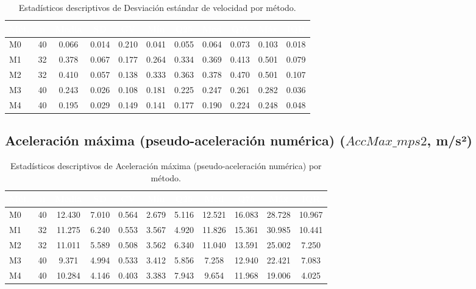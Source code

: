 \documentclass[12pt,a4paper,oneside]{book}
\begin{document}
\begin{table}[H]
\centering
\caption{Estadísticos descriptivos de Desviación estándar de velocidad por método.}
\renewcommand{\arraystretch}{1.25}
\small
\begin{tabular}{lcccccccccc}
\toprule
\rowcolor{primary}
\textcolor{white}{\textbf{Mét.}} & \textcolor{white}{\textbf{n}} & \textcolor{white}{\textbf{Media}} & \textcolor{white}{\textbf{SD}} & \textcolor{white}{\textbf{CV}} & \textcolor{white}{\textbf{Mín}} & \textcolor{white}{\textbf{Q25}} & \textcolor{white}{\textbf{Med}} & \textcolor{white}{\textbf{Q75}} & \textcolor{white}{\textbf{Máx}} & \textcolor{white}{\textbf{IQR}} \\
\midrule
M0 & 40 & 0.066 & 0.014 & 0.210 & 0.041 & 0.055 & 0.064 & 0.073 & 0.103 & 0.018 \\
M1 & 32 & 0.378 & 0.067 & 0.177 & 0.264 & 0.334 & 0.369 & 0.413 & 0.501 & 0.079 \\
M2 & 32 & 0.410 & 0.057 & 0.138 & 0.333 & 0.363 & 0.378 & 0.470 & 0.501 & 0.107 \\
M3 & 40 & 0.243 & 0.026 & 0.108 & 0.181 & 0.225 & 0.247 & 0.261 & 0.282 & 0.036 \\
M4 & 40 & 0.195 & 0.029 & 0.149 & 0.141 & 0.177 & 0.190 & 0.224 & 0.248 & 0.048 \\
\bottomrule
\end{tabular}
\end{table}

\subsection{Aceleración máxima (pseudo-aceleración numérica) ($\textit{AccMax\_mps2}$, m/s²)}

\begin{table}[H]
\centering
\caption{Estadísticos descriptivos de Aceleración máxima (pseudo-aceleración numérica) por método.}
\renewcommand{\arraystretch}{1.25}
\small
\begin{tabular}{lcccccccccc}
\toprule
\rowcolor{primary}
\textcolor{white}{\textbf{Mét.}} & \textcolor{white}{\textbf{n}} & \textcolor{white}{\textbf{Media}} & \textcolor{white}{\textbf{SD}} & \textcolor{white}{\textbf{CV}} & \textcolor{white}{\textbf{Mín}} & \textcolor{white}{\textbf{Q25}} & \textcolor{white}{\textbf{Med}} & \textcolor{white}{\textbf{Q75}} & \textcolor{white}{\textbf{Máx}} & \textcolor{white}{\textbf{IQR}} \\
\midrule
M0 & 40 & 12.430 & 7.010 & 0.564 & 2.679 & 5.116 & 12.521 & 16.083 & 28.728 & 10.967 \\
M1 & 32 & 11.275 & 6.240 & 0.553 & 3.567 & 4.920 & 11.826 & 15.361 & 30.985 & 10.441 \\
M2 & 32 & 11.011 & 5.589 & 0.508 & 3.562 & 6.340 & 11.040 & 13.591 & 25.002 & 7.250 \\
M3 & 40 & 9.371 & 4.994 & 0.533 & 3.412 & 5.856 & 7.258 & 12.940 & 22.421 & 7.083 \\
M4 & 40 & 10.284 & 4.146 & 0.403 & 3.383 & 7.943 & 9.654 & 11.968 & 19.006 & 4.025 \\
\bottomrule
\end{tabular}
\end{table}
\end{document}

